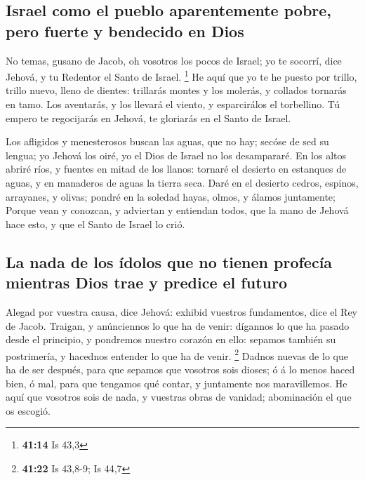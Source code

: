 \hypertarget{israel-como-el-pueblo-aparentemente-pobre-pero-fuerte-y-bendecido-en-dios}{%
\subsection{Israel como el pueblo aparentemente pobre, pero fuerte y
bendecido en
Dios}\label{israel-como-el-pueblo-aparentemente-pobre-pero-fuerte-y-bendecido-en-dios}}

 No temas, gusano de Jacob, oh vosotros los pocos de
Israel; yo te socorrí, dice Jehová, y tu Redentor el Santo de Israel.
\footnote{\textbf{41:14} Is 43,3}  He aquí que yo te he
puesto por trillo, trillo nuevo, lleno de dientes: trillarás montes y
los molerás, y collados tornarás en tamo.  Los aventarás, y
los llevará el viento, y esparcirálos el torbellino. Tú empero te
regocijarás en Jehová, te gloriarás en el Santo de Israel.

 Los afligidos y menesterosos buscan las aguas, que no hay;
secóse de sed su lengua; yo Jehová los oiré, yo el Dios de Israel no los
desampararé.  En los altos abriré ríos, y fuentes en mitad
de los llanos: tornaré el desierto en estanques de aguas, y en manaderos
de aguas la tierra seca.  Daré en el desierto cedros,
espinos, arrayanes, y olivas; pondré en la soledad hayas, olmos, y
álamos juntamente;  Porque vean y conozcan, y adviertan y
entiendan todos, que la mano de Jehová hace esto, y que el Santo de
Israel lo crió.

\hypertarget{la-nada-de-los-uxeddolos-que-no-tienen-profecuxeda-mientras-dios-trae-y-predice-el-futuro}{%
\subsection{La nada de los ídolos que no tienen profecía mientras Dios
trae y predice el
futuro}\label{la-nada-de-los-uxeddolos-que-no-tienen-profecuxeda-mientras-dios-trae-y-predice-el-futuro}}

 Alegad por vuestra causa, dice Jehová: exhibid vuestros
fundamentos, dice el Rey de Jacob.  Traigan, y anúnciennos
lo que ha de venir: dígannos lo que ha pasado desde el principio, y
pondremos nuestro corazón en ello: sepamos también su postrimería, y
hacednos entender lo que ha de venir. \footnote{\textbf{41:22} Is
  43,8-9; Is 44,7}  Dadnos nuevas de lo que ha de ser
después, para que sepamos que vosotros sois dioses; ó á lo menos haced
bien, ó mal, para que tengamos qué contar, y juntamente nos
maravillemos.  He aquí que vosotros sois de nada, y
vuestras obras de vanidad; abominación el que os escogió.

